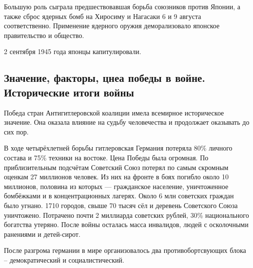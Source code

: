 Большую роль сыграла предшествовавшая борьба союзников против Японии, а также сброс ядерных бомб на Хиросиму и Нагасаки 6 и 9 августа соответственно. Применение ядерного оружия деморализовало японское правительство и общество.

2 сентября 1945 года японцы капитулировали.

\subsection{Значение, факторы, цнеа победы в войне. Исторические итоги войны}

Победа стран Антигитлеровской коалиции имела всемирное историческое значение. Она оказала влияние на судьбу человечества и продолжает оказывать до сих пор.

В ходе четырёхлетней борьбы гитлеровская Германия потеряла 80\% личного состава и 75\% техники на востоке. Цена Победы была огромная. По приблизительным подсчётам Советский Союз потерял по самым скромным оценкам 27 миллионов человек. Из них на фронте в боях погибло около 10 миллионов, половина из которых --- гражданское население, уничтоженное бомбёжками и в концентрационных лагерях. Около 6 млн советских граждан было угнано. 1710 городов, свыше 70 тысяч сёл и деревень Советского Союза уничтожено. Потрачено почти 2 миллиарда советских рублей, 30\% национального богатства утеряно. После войны осталась масса инвалидов, людей с осколочными ранениями и детей-сирот.

После разгрома германии в мире организовалось два противобортсвующих блока -- демократический и социалистический.